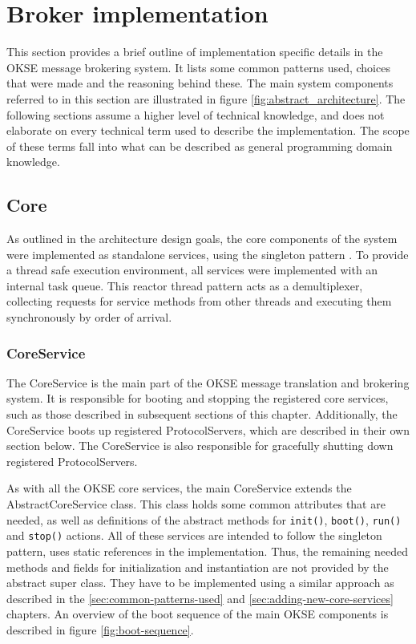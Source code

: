 \section{Broker implementation}
\label{sec:architecture_and_implementation-implementation}

This section provides a brief outline of implementation specific details in the OKSE message brokering system. It lists some common patterns used, choices that were made and the reasoning behind these. The main system components referred to in this section are illustrated in figure \ref{fig:abstract_architecture}. The following sections assume a higher level of technical knowledge, and does not elaborate on every technical term used to describe the implementation. The scope of these terms fall into what can be described as general programming domain knowledge.

\subsection{Core}
\label{subsec:architecture_and_implementation-implementation-core}

As outlined in the architecture design goals, the core components of the system were implemented as standalone services, using the singleton pattern \cite{singleton}. To provide a thread safe execution environment, all services were implemented with an internal task queue. This reactor thread pattern \cite{reactor-pattern} acts as a demultiplexer, collecting requests for service methods from other threads and executing them synchronously by order of arrival.

\subsubsection{CoreService}
\label{subsec:architecture_and_implementation-implementation-core-coreservice}

The CoreService is the main part of the OKSE message translation and brokering system. It is responsible for booting and stopping the registered core services, such as those described in subsequent sections of this chapter. Additionally, the CoreService boots up registered ProtocolServers, which are described in their own section below. The CoreService is also responsible for gracefully shutting down registered ProtocolServers.

As with all the OKSE core services, the main CoreService extends the AbstractCoreService class. This class holds some common attributes that are needed, as well as definitions of the abstract methods for \verb!init()!, \verb!boot()!, \verb!run()! and \verb!stop()! actions. All of these services are intended to follow the singleton pattern, uses static references in the implementation. Thus, the remaining needed methods and fields for initialization and instantiation are not provided by the abstract super class. They have to be implemented using a similar approach as described in the \ref{sec:common-patterns-used} and \ref{sec:adding-new-core-services} chapters. An overview of the boot sequence of the main OKSE components is described in figure \ref{fig:boot-sequence}.


